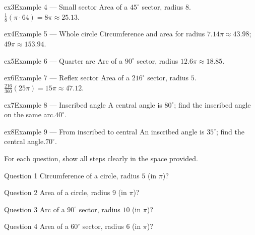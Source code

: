 \documentclass[11pt]{article}
\begin{document}
\begin{example}{ex3}{Example 4 --- Small sector}
Area of a $45^\circ$ sector, radius $8$.\soln $\tfrac18(\pi\cdot64)=8\pi\approx25.13$.
\end{example}

\begin{example}{ex4}{Example 5 --- Whole circle}
Circumference and area for radius $7$.\soln $14\pi\approx43.98$; $49\pi\approx153.94$.
\end{example}

\begin{example}{ex5}{Example 6 --- Quarter arc}
Arc of a $90^\circ$ sector, radius $12$.\soln $6\pi\approx18.85$.
\end{example}

\begin{example}{ex6}{Example 7 --- Reflex sector}
Area of a $216^\circ$ sector, radius $5$.\soln $\tfrac{216}{360}(25\pi)=15\pi\approx47.12$.
\end{example}

\begin{example}{ex7}{Example 8 --- Inscribed angle}
A central angle is $80^\circ$; find the inscribed angle on the same arc.\soln $40^\circ$.
\end{example}

\begin{example}{ex8}{Example 9 --- From inscribed to central}
An inscribed angle is $35^\circ$; find the central angle.\soln $70^\circ$.
\end{example}

\clearpage
{}
For each question, show all steps clearly in the space provided.

\begin{qbox}{Question 1}
Circumference of a circle, radius $5$ (in $\pi$)?\workspace{2.4cm}
\end{qbox}

\begin{qbox}{Question 2}
Area of a circle, radius $9$ (in $\pi$)?\workspace{2.4cm}
\end{qbox}

\begin{qbox}{Question 3}
Arc of a $90^\circ$ sector, radius $10$ (in $\pi$)?\workspace{2.4cm}
\end{qbox}

\begin{qbox}{Question 4}
Area of a $60^\circ$ sector, radius $6$ (in $\pi$)?\workspace{2.4cm}
\end{qbox}
\end{document}
